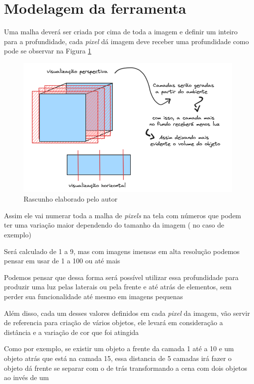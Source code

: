 \section{Modelagem da ferramenta}

Uma malha deverá ser criada por cima de toda a imagem e definir um inteiro para a profundidade, cada \textit{pixel} dá imagem deve receber uma profundidade como pode se observar na Figura \ref{fig:sketch}

\FloatBarrier
\begin{figure}[ht]
    \caption{Rascunho elaborado pelo autor}
    \centering
    \includegraphics[scale=0.5]{imagens/Sketch.png}

    \label{fig:sketch}
\end{figure}
\FloatBarrier

Assim ele vai numerar toda a malha de \textit{pixels} na tela com números que podem ter uma variação maior dependendo do tamanho da imagem ( no caso de exemplo)

Será calculado de 1 a 9, mas com imagens imensas em alta resolução podemos pensar em usar de 1 a 100 ou até mais

Podemos pensar que dessa forma será possível utilizar essa profundidade para produzir uma luz pelas laterais ou pela frente e até atrás de elementos, sem perder sua funcionalidade até mesmo em imagens pequenas

Além disso, cada um desses valores definidos em cada \textit{pixel} da imagem, vão servir de referencia para criação de vários objetos, ele levará em consideração a distância e a variação de cor que foi atingida

Como por exemplo, se existir um objeto a frente da camada 1 até a 10 e um objeto atrás que está na camada 15, essa distancia de 5 camadas irá fazer o objeto dá frente se separar com o de trás transformando a cena com dois objetos ao invés de um


